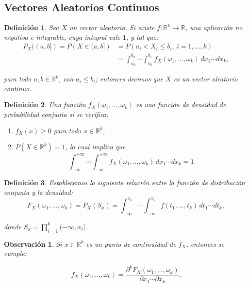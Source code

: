 \documentclass{report}
\newtheorem{dfn}{Definición}[section]
\newtheorem{obs}{Observación}[section]
\begin{document}
\subsection{Vectores Aleatorios Continuos}
\begin{dfn}
    Sea $X$ un vector aleatorio. Si existe $f:\mathbb{R}^k\rightarrow\mathbb{R}$, una aplicación no negativa e integrable, cuya integral vale $1$, y tal que:
\[
\begin{split}
    P_X((a, b]) = P\left( X \in (a, b] \right) &= P\left( a_i < X_i \leq b_i, \ i = 1, \dots, k \right) \\
    &= \int_{a_k}^{b_k} \cdots \int_{a_1}^{b_1} f_X(\omega_1, \dots, \omega_k) \, dx_1 \cdots dx_k,
\end{split}
\]

para todo $a,b\in\mathbb{R}^k$, con $a_i\leq b_i$; entonces decimos que $X$ es un \emph{vector aleatorio continuo}. 
\end{dfn}

\begin{dfn}
Una función \( f_X(\omega_1, \dots, \omega_k) \) es una \textit{función de densidad de probabilidad conjunta} si se verifica:

\begin{enumerate}
    \item \( f_X(x) \geq 0 \) para todo \( x \in \mathbb{R}^k \),
    \item \( P(X \in \mathbb{R}^k) = 1 \), lo cual implica que
    \[
    \int_{-\infty}^{+\infty} \cdots \int_{-\infty}^{+\infty} f_X(\omega_1, \dots, \omega_k) \, dx_1 \cdots dx_k = 1.
    \]
\end{enumerate}
\end{dfn}


\begin{dfn}
   Establecemos la siguiente relación entre la función de distribución conjunta y la densidad: 
\begin{equation*}
F_X(\omega_1, \dots, \omega_k) = P_X(S_x) = \int_{-\infty}^{x_k} \cdots \int_{-\infty}^{x_1} f(t_1, \dots, t_k) \, dt_1 \cdots dt_k,
\end{equation*}

donde \( S_x = \prod_{i=1}^{k} (-\infty, x_i] \). 
\end{dfn}

\begin{obs}
Si \( x \in \mathbb{R}^k \) es un punto de continuidad de \( f_X \), entonces se cumple:

\begin{equation*}
f_X(\omega_1, \dots, \omega_k) = \frac{\partial^k F_X(\omega_1, \dots, \omega_k)}{\partial x_1 \cdots \partial x_k}.
\end{equation*} 
\end{obs}
\end{document}
